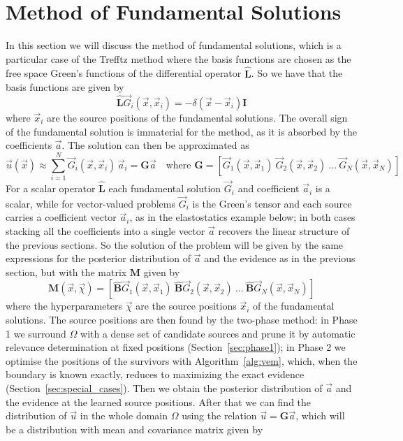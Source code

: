 \documentclass{article}
\begin{document}
\section{Method of Fundamental Solutions} \label{sec:mfs}

In this section we will discuss the method of fundamental solutions, which is a particular case of the Trefftz method where the basis functions are chosen as the free space Green's functions of the differential operator $\mathbf{\hat{L}}$. So we have that the basis functions are given by
\begin{equation}
    \mathbf{\hat{L}} \vec{G}_i(\vec{x}, \vec{x}_i) = -\delta(\vec{x}-\vec{x}_i)\mathbf{I}
\end{equation}
where $\vec{x}_i$ are the source positions of the fundamental solutions. The overall sign of the fundamental solution is immaterial for the method, as it is absorbed by the coefficients $\vec{a}$. The solution can then be approximated as 
\begin{equation}
    \vec{u}(\vec{x}) \approx \sum_{i=1}^N \vec{G}_i(\vec{x}, \vec{x}_i)\, \vec{a}_i = \mathbf{G} \vec{a} \quad \text{where } \mathbf{G} = [\vec{G}_1(\vec{x}, \vec{x}_1) \ \vec{G}_2(\vec{x}, \vec{x}_2) \ \ldots \ \vec{G}_N(\vec{x}, \vec{x}_N)]
\end{equation}
For a scalar operator $\mathbf{\hat{L}}$ each fundamental solution $\vec{G}_i$ and coefficient $\vec{a}_i$ is a scalar, while for vector-valued problems $\vec{G}_i$ is the Green's tensor and each source carries a coefficient vector $\vec{a}_i$, as in the elastostatics example below; in both cases stacking all the coefficients into a single vector $\vec{a}$ recovers the linear structure of the previous sections. So the solution of the problem will be given by the same expressions for the posterior distribution of $\vec{a}$ and the evidence as in the previous section, but with the matrix $\mathbf{M}$ given by
\begin{equation}
    \mathbf{M}(\vec{x},\vec{\chi}) = [\mathbf{\hat{B}} \vec{G}_1(\vec{x}, \vec{x}_1) \ \mathbf{\hat{B}} \vec{G}_2(\vec{x}, \vec{x}_2) \ \ldots \ \mathbf{\hat{B}} \vec{G}_N(\vec{x}, \vec{x}_N)]
\end{equation}
where the hyperparameters $\vec{\chi}$ are the source positions $\vec{x}_i$ of the fundamental solutions. The source positions are then found by the two-phase method: in Phase 1 we surround $\Omega$ with a dense set of candidate sources and prune it by automatic relevance determination at fixed positions (Section~\ref{sec:phase1}); in Phase 2 we optimise the positions of the survivors with Algorithm~\ref{alg:vem}, which, when the boundary is known exactly, reduces to maximizing the exact evidence (Section~\ref{sec:special_cases}). Then we obtain the posterior distribution of $\vec{a}$ and the evidence at the learned source positions. After that we can find the distribution of $\vec{u}$ in the whole domain $\Omega$ using the relation $\vec{u} = \mathbf{G} \vec{a}$, which will be a  distribution with mean and covariance matrix given by
\end{document}
